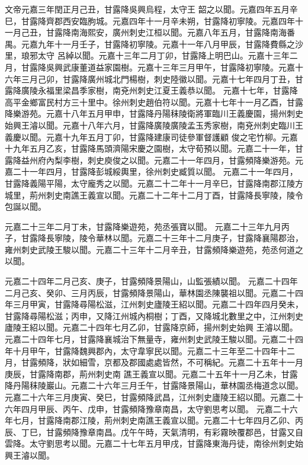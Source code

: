 \begin{pinyinscope}
 文帝元嘉三年閏正月己丑，甘露降吳興烏程，太守王
 韶之以聞。元嘉四年五月辛巳，甘露降齊郡西安臨朐城。元嘉四年十一月辛未朔，甘露降初寧陵。元嘉四年十一月己丑，甘露降南海熙安，廣州刺史江桓以聞。元嘉八年五月，甘露降南海番禺。元嘉九年十一月壬子，甘露降初寧陵。元嘉十一年八月甲辰，甘露降費縣之沙里，琅邪太守
 呂綽以聞。元嘉十三年二月丁卯，甘露降上明巴山。元嘉十三年二月，甘露降吳興武康董道益家園樹。元嘉十三年三月甲午，甘露降初寧陵。元嘉十六年三月己卯，甘露降廣州城北門楊樹，刺史陸徽以聞。元嘉十七年四月丁丑，甘露降廣陵永福里梁昌季家樹，南兗州刺史江夏王義恭以聞。
 元嘉十七年，甘露降高平金鄉富民村方三十里中。徐州刺史趙伯符以聞。元嘉十七年十一月乙酉，甘露降樂游苑。元嘉十八年五月甲申，甘露降丹陽秣陵衛將軍臨川王義慶園，揚州刺史始興王濬以聞。元嘉十八年六月，甘露降廣陵廣陵孟玉秀家樹，南兗州刺史臨川王義慶以聞。元嘉十九年五月丁卯，甘露降建康司徒參軍督護顧
 俊之宅竹柳。元嘉十九年五月乙亥，甘露降馬頭濟陽宋慶之園樹，太守荀預以聞。元嘉二十一年，甘露降益州府內梨李樹，刺史庾俊之以聞。元嘉二十一年四月，甘露頻降樂游苑。元嘉二十一年四月，甘露降彭城綏輿里，徐州刺史臧質以聞。
 元嘉二十一年四月，甘露降義陽平陽，太守龐秀之以聞。元嘉二十二年十一月辛巳，甘露降南郡江陵方城里，荊州刺史南譙王義宣以聞。元嘉二十二年十二月丁酉，甘露降長寧陵，陵令包誕以聞。



 元嘉二十三年二月丁未，甘露降樂遊苑，苑丞張寶以聞。
 元嘉二十三年九月丙子，甘露降長寧陵，陵令華林以聞。元嘉二十三年十二月庚子，甘露降襄陽郡治，雍州刺史武陵王駿以聞。元嘉二十三年十二月辛丑，甘露頻降樂遊苑，苑丞何道之以聞。



 元嘉二十四年二月己亥、庚子，甘露頻降景陽山，山監張績以聞。
 元嘉二十四年二月己亥、癸卯、三月丙辰，甘露頻降景陽山，華林園丞陳襲祖以聞。元嘉二十四年三月甲寅，甘露降尋陽松滋，江州刺史廬陵王紹以聞。元嘉二十四年四月癸未，甘露降尋陽松滋；丙申，又降江州城內桐樹；丁酉，又降城北數里之中，江州刺史廬陵王紹以聞。元嘉二十四年七月乙卯，甘露降京師，揚州刺史始興
 王濬以聞。元嘉二十四年七月，甘露降襄城治下無量寺，雍州刺史武陵王駿以聞。元嘉二十四年十月甲午，甘露降魏興郡內，太守韋寧民以聞。元嘉二十三年至二十四年十二月，甘露頻降，狀如細雪，京都及郡國處處皆然，不可稱紀。元嘉二十五年十一月庚辰，甘露降南郡，荊州刺史南
 譙王義宣以聞。元嘉二十五年十一月乙未，甘露降丹陽秣陵巖山。元嘉二十六年三月壬午，甘露降景陽山，華林園丞梅道念以聞。元嘉二十六年三月庚寅、癸巳，甘露頻降武昌，江州刺史廬陵王紹以聞。元嘉二十六年四月甲辰、丙午、戊申，甘露頻降豫章南昌，太守劉思考以聞。
 元嘉二十六年七月，甘露降南郡江陵，荊州刺史南譙王義宣以聞。元嘉二十七年四月乙卯、丙辰、丁巳，甘露頻降豫章南昌。戊午午時，天氣清明，有彩霧映覆郡邑，甘露又自雲降。太守劉思考以聞。元嘉二十七年五月甲戌，甘露降東海丹徒，南徐州刺史始興王濬以聞。




\end{pinyinscope}
